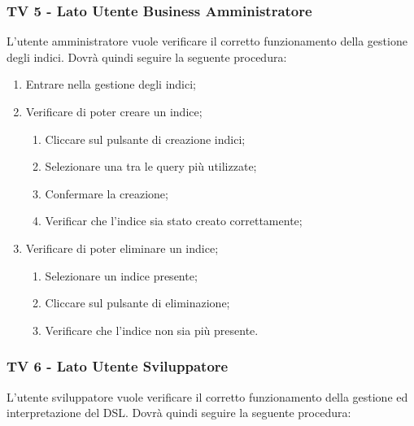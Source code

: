 \subsubsection{TV 5 - Lato Utente Business Amministratore}

L’utente amministratore vuole verificare il corretto funzionamento della gestione degli indici.
Dovrà quindi seguire la seguente procedura:

\begin{enumerate}
\item Entrare nella gestione degli indici;
\item Verificare di poter creare un indice;
\begin{enumerate}
\item Cliccare sul pulsante di creazione indici;
\item Selezionare una tra le query più utilizzate;
\item Confermare la creazione;
\item Verificar che l'indice sia stato creato correttamente;
\end{enumerate}
\item Verificare di poter eliminare un indice;
\begin{enumerate}
\item Selezionare un indice presente;
\item Cliccare sul pulsante di eliminazione;
\item Verificare che l'indice non sia più presente.
\end{enumerate}
\end{enumerate}

\subsubsection{TV 6 - Lato Utente Sviluppatore}

L’utente sviluppatore vuole verificare il corretto funzionamento della gestione ed interpretazione del DSL.
Dovrà quindi seguire la seguente procedura:


